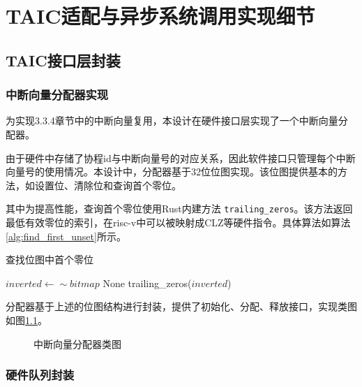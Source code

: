 \chapter{TAIC适配与异步系统调用实现细节}


\section{TAIC接口层封装}

\subsection{中断向量分配器实现}

为实现3.3.4章节中的中断向量复用，本设计在硬件接口层实现了一个中断向量分配器。

由于硬件中存储了协程id与中断向量号的对应关系，因此软件接口只管理每个中断向量号的使用情况。本设计中，分配器基于32位位图实现。该位图提供基本的方法，如设置位、清除位和查询首个零位。

其中为提高性能，查询首个零位使用Rust内建方法 \verb|trailing_zeros|。该方法返回最低有效零位的索引，在risc-v中可以被映射成CLZ等硬件指令。具体算法如算法\ref{alg:find_first_unset}所示。


\begin{algorithm}
  \caption{查找位图中首个零位}
  \label{alg:find_first_unset}
  \begin{algorithmic}
    \State $inverted \gets \sim bitmap$
    \State \Return None
    \Else
    \State \Return trailing\_zeros($\textit{inverted}$)
    \EndIf
    \EndFunction
  \end{algorithmic}
\end{algorithm}

分配器基于上述的位图结构进行封装，提供了初始化、分配、释放接口，实现类图如图\ref{中断向量分配器类图}。

\begin{figure}[htbp]
  \centering
  
  \caption{中断向量分配器类图}\label{中断向量分配器类图}
\end{figure}


\subsection{硬件队列封装}


